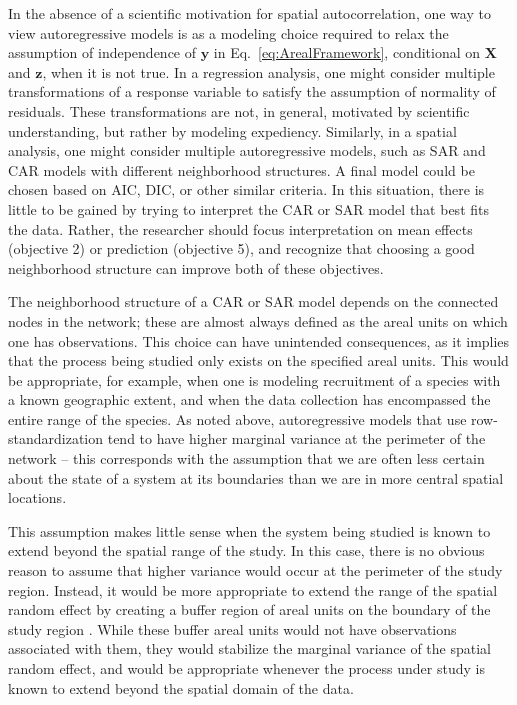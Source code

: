 \documentclass[11pt, titlepage]{article}\usepackage[]{graphicx}\usepackage[]{color}
\begin{document}
\begin{spacing}{1.9}
\begin{flushleft}
In the absence of a scientific motivation for spatial autocorrelation, one way to view autoregressive models is as a modeling choice required to relax the assumption of independence of $\mathbf{y}$ in  Eq.~\ref{eq:ArealFramework}, conditional on $\mathbf{X}$ and $\mathbf{z}$, when it is not true.  In a regression analysis, one might consider multiple transformations of a response variable to satisfy the assumption of normality of residuals.  These transformations are not, in general, motivated by scientific understanding, but rather by modeling expediency.  Similarly, in a spatial analysis, one might consider multiple autoregressive models, such as SAR and CAR models with different neighborhood structures.  A final model could be chosen based on AIC, DIC, or other similar criteria.  In this situation, there is little to be gained by trying to interpret the CAR or SAR model that best fits the data.  Rather, the researcher should focus interpretation on mean effects (objective 2) or prediction (objective 5), and recognize that choosing a good neighborhood structure can improve both of these objectives.

The neighborhood structure of a CAR or SAR model depends on the connected nodes in the network; these are almost always defined as the areal units on which one has observations.  This choice can have unintended consequences, as it implies that the process being studied only exists on the specified areal units.  This would be appropriate, for example, when one is modeling recruitment of a species with a known geographic extent, and when the data collection has encompassed the entire range of the species.  As noted above, autoregressive models that use row-standardization tend to have higher marginal variance at the perimeter of the network -- this corresponds with the assumption that we are often less certain about the state of a system at its boundaries than we are in more central spatial locations.

This assumption makes little sense when the system being studied is known to extend beyond the spatial range of the study.  In this case, there is no obvious reason to assume that higher variance would occur at the perimeter of the study region.  Instead, it would be more appropriate to extend the range of the spatial random effect by creating a buffer region of areal units on the boundary of the study region  \citep[e.g.,][]{Lind:Rue:Lind:expl:2011}.  While these buffer areal units would not have observations associated with them, they would stabilize the marginal variance of the spatial random effect, and would be appropriate whenever the process under study is known to extend beyond the spatial domain of the data.    


\end{flushleft}
\end{spacing}
\end{document}
